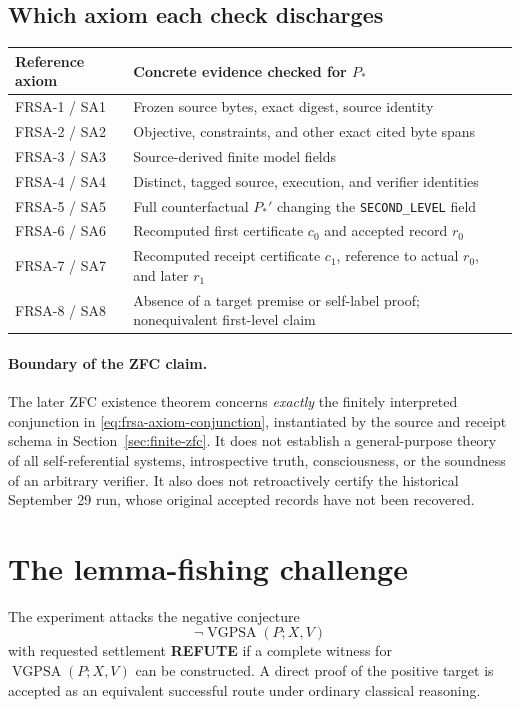 \documentclass[11pt]{article}
\theoremstyle{remark}
\newcommand{\VGPSA}{\operatorname{VGPSA}}
\begin{document}
\subsection{Which axiom each check discharges}
\label{sec:axiom-crosswalk}
\begin{center}
\small
\begin{tabularx}{\linewidth}{@{}lX@{}}\toprule
Reference axiom & Concrete evidence checked for $P_*$ \\ \midrule
FRSA-1 / SA1 & Frozen source bytes, exact digest, source identity \\
FRSA-2 / SA2 & Objective, constraints, and other exact cited byte spans \\
FRSA-3 / SA3 & Source-derived finite model fields \\
FRSA-4 / SA4 & Distinct, tagged source, execution, and verifier identities \\
FRSA-5 / SA5 & Full counterfactual $P_*'$ changing the \texttt{SECOND\_LEVEL} field \\
FRSA-6 / SA6 & Recomputed first certificate $c_0$ and accepted record $r_0$ \\
FRSA-7 / SA7 & Recomputed receipt certificate $c_1$, reference to actual $r_0$, and later $r_1$ \\
FRSA-8 / SA8 & Absence of a target premise or self-label proof; nonequivalent first-level claim \\
\bottomrule\end{tabularx}
\end{center}

\paragraph{Boundary of the ZFC claim.}
The later ZFC existence theorem concerns \emph{exactly} the finitely
interpreted conjunction in \eqref{eq:frsa-axiom-conjunction}, instantiated
by the source and receipt schema in Section~\ref{sec:finite-zfc}.
It does not establish a general-purpose theory of all self-referential
systems, introspective truth, consciousness, or the soundness of an arbitrary
verifier. It also does not retroactively certify the historical September 29
run, whose original accepted records have not been recovered.

\section{The lemma-fishing challenge}

The experiment attacks the negative conjecture
\[
\boxed{\neg\VGPSA(P;X,V)}
\]
with requested settlement \textbf{REFUTE} if a complete witness for $\VGPSA(P;X,V)$ can be constructed. A direct proof of the positive target is accepted as an equivalent successful route under ordinary classical reasoning.
\end{document}
